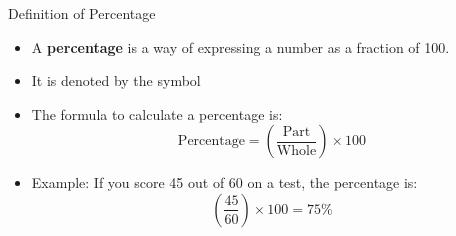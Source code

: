\documentclass{beamer}
\begin{document}
\begin{frame}{Definition of Percentage}
    \begin{itemize}
        \item A \textbf{percentage} is a way of expressing a number as a fraction of 100.
        \item It is denoted by the symbol 
        \item The formula to calculate a percentage is:
    \[
        \text{Percentage} = \left( \frac{\text{Part}}{\text{Whole}} \right) \times 100
    \]
        \item Example: If you score 45 out of 60 on a test, the percentage is:
    \[
        \left( \frac{45}{60} \right) \times 100 = 75\%
    \]
    \end{itemize}
\end{frame}
\end{document}
